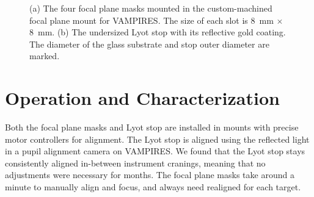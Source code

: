 \documentclass[]{spie}  %
\begin{document}
\begin{figure}
   \centering
   \hspace{0.5in}
   \caption{(a) The four focal plane masks mounted in the custom-machined focal plane mount for VAMPIRES. The size of each slot is \qty{8}{\milli\meter} $\times$ \qty{8}{\milli\meter}. (b) The undersized Lyot stop with its reflective gold coating. The diameter of the glass substrate and stop outer diameter are marked.}\label{fig:optics}
\end{figure}

\section{Operation and Characterization}\label{sec:tests}

Both the focal plane masks and Lyot stop are installed in mounts with precise motor controllers for alignment. The Lyot stop is aligned using the reflected light in a pupil alignment camera on VAMPIRES. We found that the Lyot stop stays consistently aligned in-between instrument cranings, meaning that no adjustments were necessary for months. The focal plane masks take around a minute to manually align and focus, and always need realigned for each target.
\end{document}
